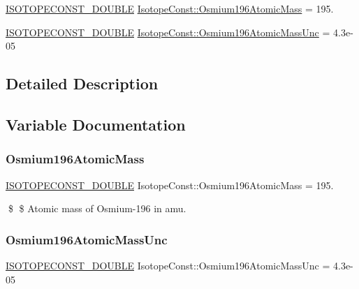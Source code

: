 \begin{DoxyCompactItemize}
\item 
\mbox{\hyperlink{group___isotope_const-_macros_ga8f45a7272ce02c0b4c65c44636ed719a}{I\+S\+O\+T\+O\+P\+E\+C\+O\+N\+S\+T\+\_\+\+D\+O\+U\+B\+LE}} \mbox{\hyperlink{group___isotope_const-_osmium-_os196_ga598897efc8a5f2f27042715168661c15}{Isotope\+Const\+::\+Osmium196\+Atomic\+Mass}} = 195.
\item 
\mbox{\hyperlink{group___isotope_const-_macros_ga8f45a7272ce02c0b4c65c44636ed719a}{I\+S\+O\+T\+O\+P\+E\+C\+O\+N\+S\+T\+\_\+\+D\+O\+U\+B\+LE}} \mbox{\hyperlink{group___isotope_const-_osmium-_os196_ga862f884b86ae3c5d6039e9663b9a46c7}{Isotope\+Const\+::\+Osmium196\+Atomic\+Mass\+Unc}} = 4.\+3e-\/05
\end{DoxyCompactItemize}


\subsection{Detailed Description}


\subsection{Variable Documentation}
\mbox{\label{group___isotope_const-_osmium-_os196_ga598897efc8a5f2f27042715168661c15}} 
\subsubsection{\texorpdfstring{Osmium196\+Atomic\+Mass}{Osmium196AtomicMass}}
{\footnotesize\ttfamily \mbox{\hyperlink{group___isotope_const-_macros_ga8f45a7272ce02c0b4c65c44636ed719a}{I\+S\+O\+T\+O\+P\+E\+C\+O\+N\+S\+T\+\_\+\+D\+O\+U\+B\+LE}} Isotope\+Const\+::\+Osmium196\+Atomic\+Mass = 195.}

\$ \$ Atomic mass of Osmium-\/196 in amu. \mbox{\label{group___isotope_const-_osmium-_os196_ga862f884b86ae3c5d6039e9663b9a46c7}} 
\subsubsection{\texorpdfstring{Osmium196\+Atomic\+Mass\+Unc}{Osmium196AtomicMassUnc}}
{\footnotesize\ttfamily \mbox{\hyperlink{group___isotope_const-_macros_ga8f45a7272ce02c0b4c65c44636ed719a}{I\+S\+O\+T\+O\+P\+E\+C\+O\+N\+S\+T\+\_\+\+D\+O\+U\+B\+LE}} Isotope\+Const\+::\+Osmium196\+Atomic\+Mass\+Unc = 4.\+3e-\/05}

